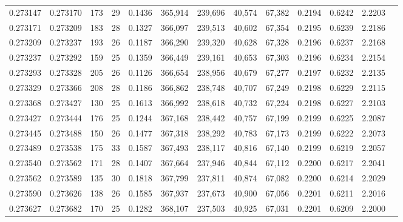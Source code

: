 \begin{tabular}{rrrrrrrrrrrrr}
0.273147 & 0.273170 &   173 &  29 &                                     0.1436 & 365,914 & 239,696 &  40,574 &  67,382 & 0.2194 & 0.6242 & 2.2203 \\
0.273171 & 0.273209 &   183 &  28 &                                     0.1327 & 366,097 & 239,513 &  40,602 &  67,354 & 0.2195 & 0.6239 & 2.2186 \\
0.273209 & 0.273237 &   193 &  26 &                                     0.1187 & 366,290 & 239,320 &  40,628 &  67,328 & 0.2196 & 0.6237 & 2.2168 \\
0.273237 & 0.273292 &   159 &  25 &                                     0.1359 & 366,449 & 239,161 &  40,653 &  67,303 & 0.2196 & 0.6234 & 2.2154 \\
0.273293 & 0.273328 &   205 &  26 &                                     0.1126 & 366,654 & 238,956 &  40,679 &  67,277 & 0.2197 & 0.6232 & 2.2135 \\
0.273329 & 0.273366 &   208 &  28 &                                     0.1186 & 366,862 & 238,748 &  40,707 &  67,249 & 0.2198 & 0.6229 & 2.2115 \\
0.273368 & 0.273427 &   130 &  25 &                                     0.1613 & 366,992 & 238,618 &  40,732 &  67,224 & 0.2198 & 0.6227 & 2.2103 \\
0.273427 & 0.273444 &   176 &  25 &                                     0.1244 & 367,168 & 238,442 &  40,757 &  67,199 & 0.2199 & 0.6225 & 2.2087 \\
0.273445 & 0.273488 &   150 &  26 &                                     0.1477 & 367,318 & 238,292 &  40,783 &  67,173 & 0.2199 & 0.6222 & 2.2073 \\
0.273489 & 0.273538 &   175 &  33 &                                     0.1587 & 367,493 & 238,117 &  40,816 &  67,140 & 0.2199 & 0.6219 & 2.2057 \\
0.273540 & 0.273562 &   171 &  28 &                                     0.1407 & 367,664 & 237,946 &  40,844 &  67,112 & 0.2200 & 0.6217 & 2.2041 \\
0.273562 & 0.273589 &   135 &  30 &                                     0.1818 & 367,799 & 237,811 &  40,874 &  67,082 & 0.2200 & 0.6214 & 2.2029 \\
0.273590 & 0.273626 &   138 &  26 &                                     0.1585 & 367,937 & 237,673 &  40,900 &  67,056 & 0.2201 & 0.6211 & 2.2016 \\
0.273627 & 0.273682 &   170 &  25 &                                     0.1282 & 368,107 & 237,503 &  40,925 &  67,031 & 0.2201 & 0.6209 & 2.2000 \\

\end{tabular}
